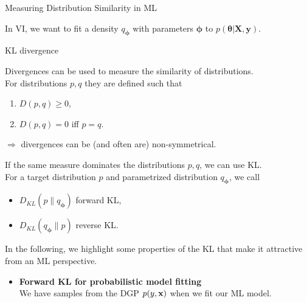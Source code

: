 \documentclass[11pt,compress,t,notes=noshow, xcolor=table]{beamer}
\begin{document}
\begin{vbframe} {Measuring Distribution Similarity in ML}
\begin{itemize}
In VI, we want to fit a density $q_{\bm{\phi}}$ with parameters $\bm{\phi}$ to 
    $p(\bm{\theta}\vert \mathbf{X}, \mathbf{y}).$

\end{itemize}

\end{vbframe}

\begin{vbframe}{KL divergence}

Divergences can be used to measure the similarity of distributions.\\
\lz For distributions $p, q$ they are defined such that
\begin{enumerate}
    \item $D(p, q) \geq 0,$
    \item $D(p, q) = 0$ iff $p = q.$
\end{enumerate}
$\Rightarrow$ divergences can be (and often are) non-symmetrical. \\
 \lz
 
If the same measure dominates the distributions $p,q$, we can use KL. \\
For a target distribution $p$ and parametrized distribution $q_{\bm{\phi}}$, we call
\begin{itemize}
    \item $D_{KL}(p \| q_{\bm{\phi}})$ forward KL,
    \item $D_{KL}(q_{\bm{\phi}} \| p)$ reverse KL.
\end{itemize}
\lz
In the following, we highlight some properties of the KL that make it attractive from an ML perspective.

\framebreak

\begin{itemize}
    \item \textbf{Forward KL for probabilistic model fitting}
    \\ We have samples from the DGP $p(y, \mathbf{x})$ when we fit our ML model.
    \\
    \lz
    

\end{itemize}
\end{vbframe}
\end{document}
